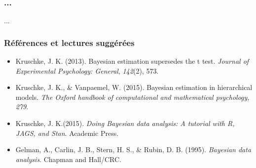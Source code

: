 \documentclass{beamer}
\begin{document}
\begin{frame}
    \frametitle{...}
    ...
\end{frame}


\begin{frame}
    \frametitle{Références et lectures suggérées}
    \begin{itemize}
      \item Kruschke, J. K. (2013). Bayesian estimation supersedes the t test.
            \emph{Journal of Experimental Psychology: General}, \emph{142}(2), 573.
      \item Kruschke, J. K., \& Vanpaemel, W. (2015). Bayesian estimation in hierarchical models.
            \emph{The Oxford handbook of computational and mathematical psychology, 279}.
      \item Kruschke, J. K.(2015). \emph{Doing Bayesian data analysis: A tutorial with R, JAGS, and Stan}.
            Academic Press.
      \item Gelman, A., Carlin, J. B., Stern, H. S., \& Rubin, D. B. (1995).
            \emph{Bayesian data analysis}. Chapman and Hall/CRC.
    \end{itemize}
\end{frame}


\end{document}
